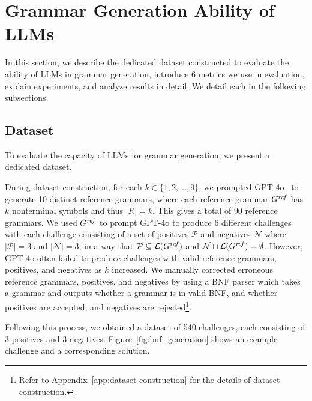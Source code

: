 \section{Grammar Generation Ability of LLMs}
In this section, we describe the dedicated dataset constructed to evaluate the ability of LLMs in grammar generation, introduce 6 metrics we use in evaluation, explain experiments, and analyze results in detail. We detail each in the following subsections.

\subsection{Dataset}
To evaluate the capacity of LLMs for grammar generation, we present a dedicated dataset. 

During dataset construction, for each $k \in \{1,2,\dots,9\}$, we prompted GPT-4o~\cite{openai2024gpt4technicalreport} to generate 10 distinct reference grammars, where each reference grammar $G^{\mathit{ref}}$ has $k$ nonterminal symbols and thus $|R| = k$. This gives a total of $90$ reference grammars.
We used $G^{\mathit{ref}}$ to prompt GPT-4o to produce 6 different challenges with each challenge consisting of a set of positives $\mathcal{P}$ and negatives $\mathcal{N}$ where $|\mathcal{P}|=3$ and $|\mathcal{N}|=3$, in a way that $\mathcal{P} \subseteq \mathcal{L}(G^{\mathit{ref}})$ and $\mathcal{N} \cap \mathcal{L}(G^{\mathit{ref}}) = \emptyset$. However, GPT-4o often failed to produce challenges with valid reference grammars, positives, and negatives as $k$ increased. We manually corrected erroneous reference grammars, positives, and negatives by using a BNF parser which takes a grammar and outputs whether a grammar is in valid BNF, and whether positives are accepted, and negatives are rejected\footnote{Refer to Appendix~\ref{app:dataset-construction} for the details of dataset construction.}.

Following this process, we obtained a dataset of 540 challenges, each consisting of 3 positives and 3 negatives.
Figure~\ref{fig:bnf_generation} shows an example challenge and a corresponding solution. 

